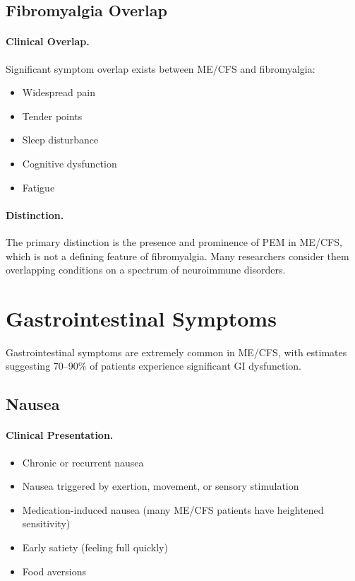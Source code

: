 \subsection{Fibromyalgia Overlap}
\label{subsec:fibromyalgia}

\paragraph{Clinical Overlap.}
Significant symptom overlap exists between ME/CFS and fibromyalgia:
\begin{itemize}
    \item Widespread pain
    \item Tender points
    \item Sleep disturbance
    \item Cognitive dysfunction
    \item Fatigue
\end{itemize}

\paragraph{Distinction.}
The primary distinction is the presence and prominence of PEM in ME/CFS, which is not a defining feature of fibromyalgia. Many researchers consider them overlapping conditions on a spectrum of neuroimmune disorders.

\section{Gastrointestinal Symptoms}
\label{sec:gi-symptoms}

Gastrointestinal symptoms are extremely common in ME/CFS, with estimates suggesting 70--90\% of patients experience significant GI dysfunction.

\subsection{Nausea}
\label{subsec:nausea}

\paragraph{Clinical Presentation.}
\begin{itemize}
    \item Chronic or recurrent nausea
    \item Nausea triggered by exertion, movement, or sensory stimulation
    \item Medication-induced nausea (many ME/CFS patients have heightened sensitivity)
    \item Early satiety (feeling full quickly)
    \item Food aversions
\end{itemize}

